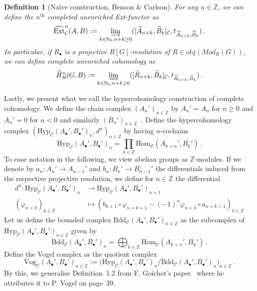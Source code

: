 \documentclass[12pt,a4paper]{article}
\numberwithin{equation}{section}
\newtheorem{defn}[thm]{Definition}
\theoremstyle{nonumberplain}
\begin{document}
\begin{defn}[Naïve construction, Benson \& Carlson]
For any $n \in \mathbb{Z}$, we can define the $n^{\text{th}}$ completed unenriched Ext-functor as
\[ \widehat{\mathrm{Ext}}_{\mathcal{C}}^n(A, B) := \varinjlim_{k \in \mathbb{N}_0, n+k \geq 0} ([\widetilde{A}_{n+k}, \widetilde{B}_k]_{\mathcal{C}}, t_{\widetilde{A}_{n+k}, \widetilde{B}_k}) \, . \]
In particular, if $R_{\bullet}$ is a projective $R[G]$-resolution of $R \in \mathrm{obj}(Mod_R(G))$, we can define complete unenriched cohomology as
\[ \widehat{H}_R^n(G, B) := \varinjlim_{k \in \mathbb{N}_0, n+k \geq 0} ([\widetilde{R}_{n+k}, \widetilde{B}_k]_{\mathcal{C}}, t_{\widetilde{R}_{n+k}, \widetilde{B}_k}) \, . \]
\end{defn}

Lastly, we present what we call the hypercohomology construction of complete cohomology. We define the chain complex $(A_n')_{n \in \mathbb{Z}}$ by $A_n' = A_n$ for $n \geq 0$ and $A_n' = 0$ for $n < 0$ and similarly $(B_n')_{n \in \mathbb{Z}}$~\cite[p.~209]{kro95}. Define the hypercohomology complex $(\mathrm{Hyp}_{\mathcal{C}}(A_{\bullet}', B_{\bullet}')_n, d^n)_{n \in \mathbb{Z}}$ by having $n$-cochains 
\[ \mathrm{Hyp}_{\mathcal{C}}(A_{\bullet}', B_{\bullet}')_n = \prod_{k \in \mathbb{Z}} \mathrm{Hom}_{\mathcal{C}}(A_{k+n}', B_k') \, . \]
To ease notation in the following, we view abelian groups as $\mathbb{Z}$-modules. If we denote by $a_n: A_n' \rightarrow A_{n-1}'$ and $b_n: B_n' \rightarrow B_{n-1}'$ the differentials induced from the respective projective resolution, we define for $n \in \mathbb{Z}$ the differential
\begin{align}
d^n: \mathrm{Hyp}_{\mathcal{C}}(A_{\bullet}', B_{\bullet}')_n &\rightarrow \mathrm{Hyp}_{\mathcal{C}}(A_{\bullet}', B_{\bullet}')_{n+1} \label{eq:hypercohombd} \\ (\varphi_{n+k})_{k \in \mathbb{Z}} &\mapsto (b_{k+1} \circ \varphi_{n+k+1} - (-1)^n \varphi_{n+k} \circ a_{n+k+1})_{k \in \mathbb{Z}} \nonumber
\end{align}
Let us define the bounded complex $\mathrm{Bdd}_{\mathcal{C}}(A_{\bullet}', B_{\bullet}')_{n \in \mathbb{Z}}$ as the subcomplex of $\mathrm{Hyp}_{\mathcal{C}}(A_{\bullet}', B_{\bullet}')_{n \in \mathbb{Z}}$ given by
\[ \mathrm{Bdd}_{\mathcal{C}}(A_{\bullet}', B_{\bullet}')_n = \bigoplus_{k \in \mathbb{Z}} \mathrm{Hom}_{\mathcal{C}}(A_{k+n}', B_k') \, . \]
Define the Vogel complex as the quotient complex~\cite[p.~209]{kro95}
\[ \mathrm{Vog}_{\mathcal{C}}(A_{\bullet}', B_{\bullet}')_{n \in \mathbb{Z}} := \Big(\mathrm{Hyp}_{\mathcal{C}}(A_{\bullet}', B_{\bullet}')_n / \mathrm{Bdd}_{\mathcal{C}}(A_{\bullet}', B_{\bullet}')_n \Big)_{n \in \mathbb{Z}} \, . \]
By this, we generalise Definition~1.2 from F.\! Goichot's paper~\cite{goi92} where he attributes it to P.\! Vogel on page~39.
\end{document}
